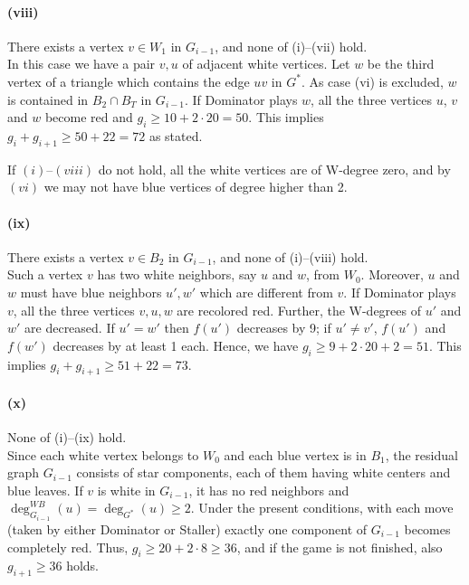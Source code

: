 \documentclass[12pt]{article}
\begin{document}
\paragraph{(viii)} There exists a vertex $v \in W_1$ in $G_{i-1}$,  and none of (i)--(vii) hold.\\ 
In this case we have a pair $v,u$ of adjacent white vertices. Let $w$ be the third vertex of a triangle which contains the edge $uv$ in $G^*$. As case (vi) is excluded, $w$ is  contained in $ B_2\cap B_T$ in $G_{i-1}$. If Dominator plays $w$, all the three vertices $u$, $v$ and $w$ become  red and $g_i \ge 10+ 2\cdot 20=50$. This implies $g_i+g_{i+1}\ge 50+22 =72$ as stated. 

\medskip
If $(i)$--$(viii)$ do not hold, all the white vertices are of W-degree zero, and by $(vi)$ we may not have blue vertices of degree higher than 2.

\paragraph{(ix)} There exists a vertex $v \in B_2$ in $G_{i-1}$,  and none of (i)--(viii) hold.\\ 
Such a vertex $v$ has two white neighbors, say $u$ and $w$, from $W_0$. Moreover, $u$ and $w$ must have blue neighbors $u', w'$ which are different from $v$. If Dominator plays $v$, all the three vertices $v,u, w$ are recolored red.  Further, the W-degrees of $u'$ and $w'$ are decreased. If $u'=w'$ then $f(u')$ decreases by 9; if $u'\neq v'$, $f(u')$ and $f(w')$ decreases by at least 1 each.  Hence, we have $g_i \ge 9+2\cdot 20 +2= 51$. This implies $g_i+g_{i+1} \ge 51+22=73$.

\paragraph{(x)} None of (i)--(ix) hold.\\ 
Since each white vertex belongs to $W_0$ and each blue vertex is in $B_1$, the residual graph $G_{i-1}$ consists of star components, each of them having white centers and blue leaves. If $v$ is white in $G_{i-1}$, it has no red neighbors and $\deg^{WB}_{G_{i-1}}(u)=\deg_{G^*}(u) \ge 2$. Under the present conditions, with each move (taken by either Dominator or Staller) exactly one component of $G_{i-1}$ becomes completely red. Thus, $g_i\ge 20+2\cdot 8 \ge 36$, and if the game is not finished, also $g_{i+1} \ge 36$ holds.
\end{document}
